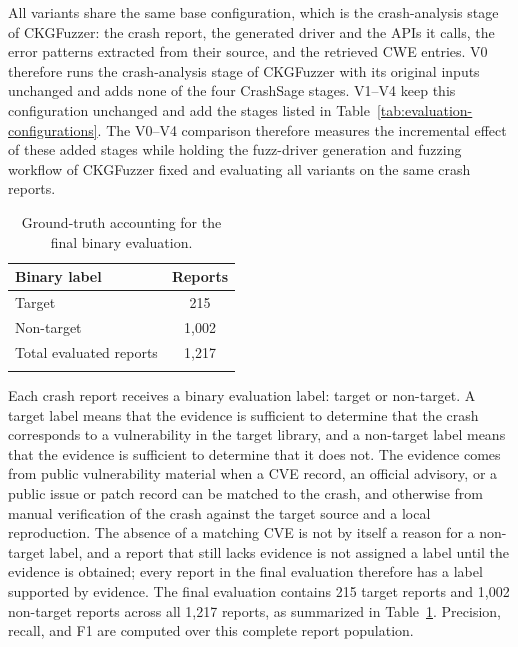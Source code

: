 \documentclass[pdflatex,sn-basic]{sn-jnl}%
\renewcommand{\arraystretch}{1.16}%
\theoremstyle{thmstyleone}%
\theoremstyle{thmstyletwo}%
\theoremstyle{thmstylethree}%
\begin{document}
{\color{blue}All variants share the same base configuration, which is the crash-analysis stage of CKGFuzzer: the crash report, the generated driver and the APIs it calls, the error patterns extracted from their source, and the retrieved CWE entries. V0 therefore runs the crash-analysis stage of CKGFuzzer with its original inputs unchanged and adds none of the four CrashSage stages. V1--V4 keep this configuration unchanged and add the stages listed in Table~\ref{tab:evaluation-configurations}. The V0--V4 comparison therefore measures the incremental effect of these added stages} while holding the fuzz-driver generation and fuzzing workflow of CKGFuzzer fixed {\color{blue}and evaluating all variants on the same crash reports}.

\FloatBarrier
\begin{table}[!htbp]
\caption{{\color{blue}Ground-truth accounting for the final binary evaluation.}}
\label{tab:ground-truth-accounting}
\centering
\color{blue}
\small
\setlength{\tabcolsep}{3pt}
\renewcommand{\arraystretch}{1.12}
\begin{tabular*}{\linewidth}{@{\extracolsep{\fill}}lc}
\toprule
Binary label & Reports \\
\midrule
Target & 215 \\
Non-target & 1,002 \\
Total evaluated reports & 1,217 \\
\botrule
\end{tabular*}
\end{table}

{\color{blue}
Each crash report receives a binary evaluation label: target or non-target. A target label means that the evidence is sufficient to determine that the crash corresponds to a vulnerability in the target library, and a non-target label means that the evidence is sufficient to determine that it does not. The evidence comes from public vulnerability material when a CVE record, an official advisory, or a public issue or patch record can be matched to the crash, and otherwise from manual verification of the crash against the target source and a local reproduction. The absence of a matching CVE is not by itself a reason for a non-target label, and a report that still lacks evidence is not assigned a label until the evidence is obtained; every report in the final evaluation therefore has a label supported by evidence. The final evaluation contains 215 target reports and 1,002 non-target reports across all 1,217 reports, as summarized in Table~\ref{tab:ground-truth-accounting}. Precision, recall, and F1 are computed over this complete report population.
}
\end{document}

